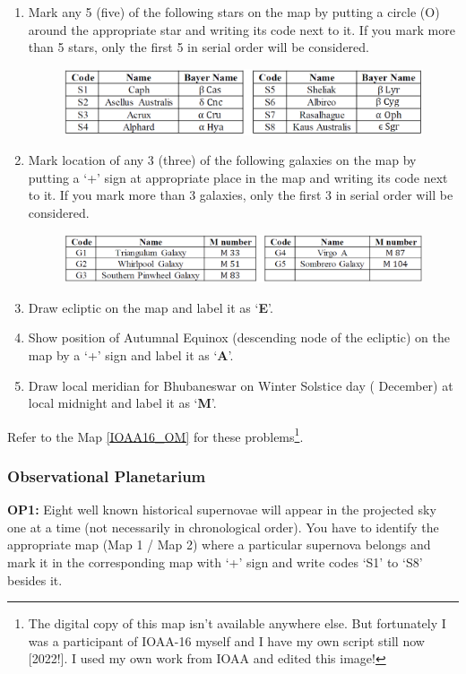 \documentclass[a4paper,12pt]{extarticle}
\begin{document}
\begin{enumerate}
    \item Mark any 5 (five) of the following stars on the map by putting a circle (O) around the appropriate star and writing its code next to it. If you mark more than 5 stars, only the first 5 in serial order will be considered.
    \begin{figure}[H]
    \centering
    \includegraphics[width=0.9\linewidth]{2016_T1.PNG}
\end{figure}
    \item  Mark location of any 3 (three) of the following galaxies on the map by putting a ‘+’ sign at appropriate place in the map and writing its code next to it. If you mark more than 3 galaxies, only the first 3 in serial order will be considered.
        \begin{figure}[H]
    \centering
    \includegraphics[width=0.9\linewidth]{2016_T2.PNG}
\end{figure}
\item Draw ecliptic on the map and label it as ‘\textbf{E}’.
\item Show position of Autumnal Equinox (descending node of the ecliptic) on the map by a ‘+’ sign and label it as ‘\textbf{A}’.
\item Draw local meridian for Bhubaneswar on Winter Solstice day ( December) at local midnight and label it as ‘\textbf{M}’.
\end{enumerate}

Refer to the Map \ref{IOAA16_OM} for these problems\footnote{The digital copy of this map isn't available anywhere else. But fortunately I was a participant of IOAA-16 myself and I have my own script still now [2022!]. I used my own work from IOAA and edited this image!}. 

\subsubsection{Observational Planetarium}

\textbf{OP1:} Eight well known historical supernovae will appear in the projected sky one at a time (not necessarily in chronological order). You have to identify the appropriate map (Map 1 / Map 2) where a particular supernova belongs and mark it in the corresponding map with ‘+’ sign and write codes ‘S1’ to ‘S8’ besides it.\\
\clearpage
\end{document}

